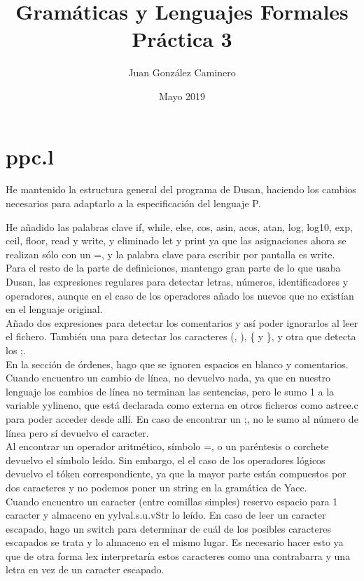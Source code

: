 \documentclass{article}
\title{Gramáticas y Lenguajes Formales\\Práctica 3}
\author{Juan González Caminero}
\date{Mayo 2019}
\begin{document}
\begin{titlepage}
\maketitle
\thispagestyle{empty}
\end{titlepage}

\newpage
\tableofcontents
\newpage

\section{ppc.l}
He mantenido la estructura general del programa de Dusan, haciendo los cambios necesarios para adaptarlo a la especificación del lenguaje P.

He añadido las palabras clave if, while, else, cos, asin, acos, atan, log, log10, exp, ceil, floor, read y write, y eliminado let y print ya que las asignaciones ahora se realizan sólo con un =, y la palabra clave para escribir por pantalla es write.\\

Para el resto de la parte de definiciones, mantengo gran parte de lo que usaba Dusan, las expresiones regulares para detectar letras, números, identificadores y operadores, aunque en el caso de los operadores añado los nuevos que no existían en el lenguaje original.\\
Añado dos expresiones para detectar los comentarios y así poder ignorarlos al leer el fichero. También una para detectar los caracteres (, ), \{ y \}, y otra que detecta los ;.\\

En la sección de órdenes, hago que se ignoren espacios en blanco y comentarios. Cuando encuentro un cambio de línea, no devuelvo nada, ya que en nuestro lenguaje los cambios de línea no terminan las sentencias, pero le sumo 1 a la variable yylineno, que está declarada como externa en otros ficheros como astree.c para poder acceder desde allí. En caso de encontrar un ;, no le sumo al número de línea pero sí devuelvo el caracter.\\

Al encontrar un operador aritmético, símbolo =, o un paréntesis o corchete devuelvo el símbolo leído. Sin embargo, el el caso de los operadores lógicos devuelvo el tóken correspondiente, ya que la mayor parte están compuestos por dos caracteres y no podemos poner un string en la gramática de Yacc.\\

Cuando encuentro un caracter (entre comillas simples) reservo espacio para 1 caracter y almaceno en yylval.s.u.vStr lo leído. En caso de leer un caracter escapado, hago un switch para determinar de cuál de los posibles caracteres escapados se trata y lo almaceno en el mismo lugar. Es necesario hacer esto ya que de otra forma lex interpretaría estos caracteres como una contrabarra y una letra en vez de un caracter escapado.\\
\end{document}
